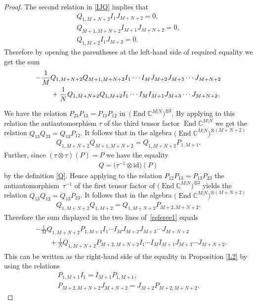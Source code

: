 \documentclass[10pt,a4paper]{amsart}
\numberwithin{equation}{section}
\def\1{^{-1}}
\def\CC{{\mathbb{C}}}
\def\CMN{\CC^{M|N}}
\def\End{\operatorname{End}}
\def\id{{\mathrm{id}}}
\def\ot{\otimes}
\begin{document}
\begin{proof}
The second relation in \eqref{IJQ} implies that
\begin{gather*}
Q_{1,M+N+2} I_{1} J_{M+N+2}=0 ,\\
Q_{M+1,M+N+2} I_{M+1}J_{M+N+2}=0 ,\\
Q_{1,M+2} I_{1} J_{M+2}=0 .
\end{gather*}
Therefore by opening the parentheses at the left-hand side of
required equality we get the sum
\begin{gather}
\notag
- \frac1M Q_{1,M+N+2} Q_{M+1,M+N+2}
I_{1} \cdots I_{M}
J_{M+2}
J_{M+3} \cdots J_{M+N+2}\\
\label{referee1}
\qquad{} + \frac1N
Q_{1,M+N+2} Q_{1,M+2}
I_{1} \cdots I_{M}
I_{M+1}
J_{M+3} \cdots J_{M+N+2} .
\end{gather}

We have the relation
$P_{23} P_{13}=P_{13} P_{12}$ in~$\big(\End\CMN\big)^{\ot3} $.
By applying to this relation the antiautomorphism $\tau$
of the third tensor factor $\End\CMN$ we get the relation
$Q_{13} Q_{23}=Q_{13} P_{12} $.
It follows that in the algebra $\big(\End\CMN\big)^{\ot (M+N+2)}$
\begin{gather}\label{QQP}
Q_{1,M+N+2} Q_{M+1,M+N+2}=Q_{1,M+N+2} P_{1,M+1} .
\end{gather}
Further, since $(\tau\ot\tau)(P)=P$ we have the equality
\begin{gather*}
Q=\big( \tau\1\ot\id \big) ( P )
\end{gather*}
by the definition \eqref{Q}.
Hence applying to the relation $P_{12} P_{13}=P_{13} P_{23}$
the antiautomorphism~$\tau\1$ of the first tensor factor of
$\big(\End\CMN\big)^{\ot3}$ yields the relation
$Q_{13} Q_{12}=Q_{13} P_{23} $.
It follows that in the algebra $\big(\End\CMN\big)^{\ot (M+N+2)}$
\begin{gather}\label{QQQ}
Q_{1,M+N+2} Q_{1,M+2}=Q_{1,M+N+2} P_{M+2,M+N+2} .
\end{gather}
Therefore the sum displayed in the two lines of~\eqref{referee1} equals
\begin{gather*}
\begin{split} &
- \frac1M Q_{1,M+N+2} P_{1,M+1}I_{1} \cdots I_{M}
J_{M+2}J_{M+3} \cdots J_{M+N+2}\\
& \qquad {} + \frac1N
Q_{1,M+N+2} P_{M+2,M+N+2}I_{1} \cdots I_{M}I_{M+1}J_{M+3} \cdots J_{M+N+2} .
\end{split}
\end{gather*}
This can be written as the right-hand side of the equality in
Proposition \ref{L2} by using the relations
\begin{gather*}
P_{1,M+1} I_{1}=I_{M+1} P_{1,M+1} ,\\
P_{M+2,M+N+2} J_{M+N+2}=J_{M+2} P_{M+2,M+N+2} .\tag*{\qed}
\end{gather*}
\renewcommand{\qed}{}
\end{proof}
\end{document}
